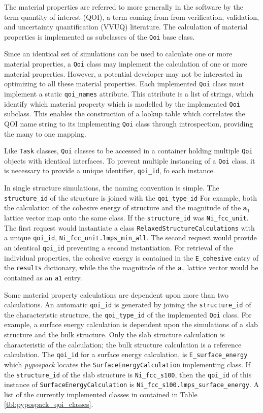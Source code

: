 The material properties are referred to more generally in the software by the term quantity of interest (QOI), a term coming from  from verification, validation, and uncertainty quantification (VVUQ) literature.
The calculation of material properties is implemented as subclasses of the \verb|Qoi| base class.

Since an identical set of simulations can be used to calculate one or more material properties, a \verb|Qoi| class may implement the calculation of one or more material properties.  However, a potential developer may not be interested in optimizing to all these material properties.  Each implemented \verb|Qoi| class must implement a static \verb|qoi_names| attribute.  This attribute is a list of strings, which identify which material property which is modelled by the implemented \verb|Qoi| subclass.  This enables the construction of a lookup table which correlates the QOI name string to its implementing \verb|Qoi| class through introspection, providing the many to one mapping.

Like \verb|Task| classes, \verb|Qoi| classes to be accessed in a container holding multiple \verb|Qoi| objects with identical interfaces.  To prevent multiple instancing of a \verb|Qoi| class, it is necessary to provide a unique identifier, \verb|qoi_id|, fo each instance.

In single structure simulations, the naming convention is simple.  The \verb|structure_id| of the structure is joined with the \verb|qoi_type_id|  For example, both the calculation of the cohesive energy of structure  and the magnitude of the $\bm{a}_1$ lattice vector map onto the same class.  If the \verb|structure_id| was \verb|Ni_fcc_unit|.  The first request would instantiate a class \verb|RelaxedStructureCalculations| with a unique \verb|qoi_id|, \verb|Ni_fcc_unit.lmps_min_all|.  The second request would provide an identical \verb|qoi_id| preventing a second instantiation.  For retrieval of the individual properties, the cohesive energy is contained in the \verb|E_cohesive| entry of the \verb|results| dictionary, while the the magnitude of the $\bm{a}_1$ lattice vector would be contained as an \verb|a1| entry.

Some material property calculations are dependent upon more than two calculations.  An automatic \verb|qoi_id| is generated by joining the \verb|structure_id| of the characteristic structure, the \verb|qoi_type_id| of the implemented \verb|Qoi| class.  For example, a surface energy calculation is dependent upon the simulations of a slab structure and the bulk structure.  Only the slab structure calculation is characteristic of the calculation; the bulk structure calculation is a reference calculation.  The \verb|qoi_id| for a surface energy calculation, is \verb|E_surface_energy| which \emph{pypospack} locates the \verb|SurfaceEnergyCalculation| implementing class.  If the \verb|structure_id| of the slab structure is \verb|Ni_fcc_s100|, then the \verb|qoi_id| of this instance of \verb|SurfaceEnergyCalculation| is \verb|Ni_fcc_s100.lmps_surface_energy|.  A list of the currently implemented classes in contained in Table \ref{tbl:pypospack_qoi_classes}.

